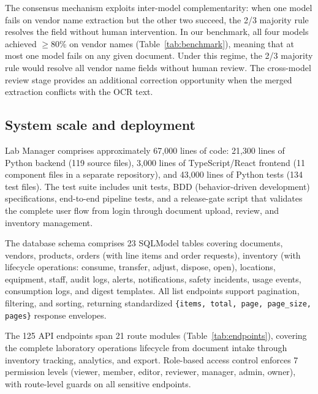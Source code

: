 \documentclass[11pt]{article}
\begin{document}
The consensus mechanism exploits inter-model complementarity:
when one model fails on vendor name extraction but the other two succeed,
the 2/3 majority rule resolves the field without human intervention. In
our benchmark, all four models achieved $\geq$80\% on vendor names
(Table~\ref{tab:benchmark}), meaning that at most one model fails on any
given document. Under this regime, the 2/3 majority rule would resolve
all vendor name fields without human review. The cross-model review stage
provides an additional correction opportunity when the merged extraction
conflicts with the OCR text.

\subsection{System scale and deployment}
\label{sec:deployment}

Lab Manager comprises approximately 67,000 lines of code: 21,300
lines of Python backend (119 source files), 3,000 lines of TypeScript/React
frontend (11 component files in a separate repository), and 43,000 lines of
Python tests (134 test files). The test suite includes unit tests, BDD
(behavior-driven development) specifications, end-to-end pipeline tests,
and a release-gate script that validates the complete user flow from login
through document upload, review, and inventory management.

The database schema comprises 23 SQLModel tables covering documents,
vendors, products, orders (with line items and order requests), inventory
(with lifecycle operations: consume, transfer, adjust, dispose, open),
locations, equipment, staff, audit logs, alerts, notifications, safety
incidents, usage events, consumption logs, and digest templates. All
list endpoints support pagination, filtering, and sorting, returning
standardized \texttt{\{items, total, page, page\_size, pages\}} response
envelopes.

The 125 API endpoints span 21 route modules (Table~\ref{tab:endpoints}),
covering the complete laboratory operations lifecycle from document intake
through inventory tracking, analytics, and export. Role-based access control
enforces 7 permission levels (viewer, member, editor, reviewer, manager,
admin, owner), with route-level guards on all sensitive endpoints.
\end{document}
